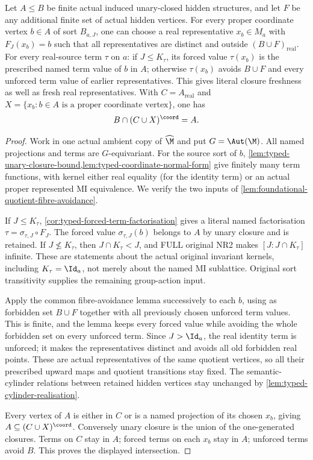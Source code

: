 \begin{lemma}
\label{lem:typed-fresh-representatives}
Let $A\le B$ be finite actual induced unary-closed hidden structures,
and let $F$ be any additional finite set of actual hidden vertices.
For every proper coordinate vertex $b\in A$ of sort $B_{a,J}$,
one can choose a real representative $x_b\in M_a$ with $F_J(x_b)=b$
such that all representatives are distinct and outside
$(B\cup F)_{\mathrm{real}}$. For every real-source term $\tau$ on $a$:
if $J\le K_\tau$, its forced value $\tau(x_b)$ is the prescribed
named term value of $b$ in $A$; otherwise $\tau(x_b)$ avoids
$B\cup F$ and every unforced term value of earlier representatives.
This gives literal closure freshness as well as fresh real representatives. With $C=A_{\mathrm{real}}$ and
$X=\{x_b:b\in A\text{ is a proper coordinate vertex}\}$, one has
\[
                  B\cap(C\cup X)^{\coord}=A.
\]
\end{lemma}
\begin{proof}
Work in one actual ambient copy of $\widehat\M$ and put $G=\Aut(\M)$.
All named projections and terms are $G$-equivariant. For the source sort
of $b$, \cref{lem:typed-unary-closure-bound,lem:typed-coordinate-normal-form}
give finitely many term functions, with kernel either real equality
(for the identity term) or an actual proper represented MI equivalence.
We verify the two inputs of
\cref{lem:foundational-quotient-fibre-avoidance}.

If $J\le K_\tau$, \cref{cor:typed-forced-term-factorisation}
gives a literal named factorisation $\tau=\sigma_{\tau,J}\circ F_J$.
The forced value $\sigma_{\tau,J}(b)$ belongs to $A$ by unary closure
and is retained. If $J\nleq K_\tau$, then $J\cap K_\tau<J$,
and FULL original NR2 makes $[J:J\cap K_\tau]$ infinite.
These are statements about the actual original invariant kernels,
including $K_\tau=\Id_a$, not merely about the named MI sublattice.
Original sort transitivity supplies the remaining group-action input.

Apply the common fibre-avoidance lemma successively to each $b$,
using as forbidden set $B\cup F$ together with all previously chosen
unforced term values. This is finite, and the lemma keeps every forced
value while avoiding the whole forbidden set on every unforced term.
Since $J>\Id_a$, the real identity term is unforced; it makes the
representatives distinct and avoids all old forbidden real points.
These are actual representatives of the same quotient vertices, so
all their prescribed upward maps and quotient transitions stay fixed.
The semantic-cylinder relations between retained hidden vertices
stay unchanged by \cref{lem:typed-cylinder-realisation}.

Every vertex of $A$ is either in $C$ or is a named projection of its
chosen $x_b$, giving $A\subseteq(C\cup X)^{\coord}$.
Conversely unary closure is the union of the one-generated closures.
Terms on $C$ stay in $A$; forced terms on each $x_b$ stay in $A$;
unforced terms avoid $B$. This proves the displayed intersection.
\end{proof}

